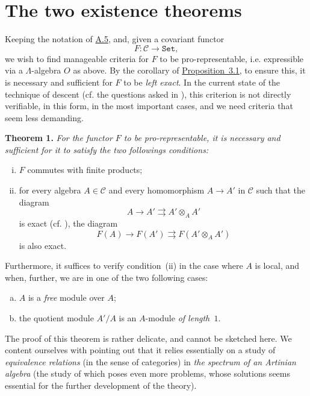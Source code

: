 \documentclass{article}
\newenvironment{itenv}[1]
  {\phantomsection\par\medskip\noindent\textbf{#1.}\itshape}
  {\par\medskip}
\renewcommand{\cal}[1]{{\mathcal{#1}}}
\newcommand{\Set}{\mathtt{Set}}
\newcommand{\oldpage}[1]{\marginpar{\footnotesize$\Big\vert$ \textit{p.~#1}}}
\begin{document}
\part{The two existence theorems}
\label{B}

Keeping the notation of \hyperref[A.5]{A.5}, and, given a covariant functor
\[
  F\colon \cal{C} \to \Set,
\]
we wish to find manageable criteria for $F$ to be pro-representable, i.e. expressible via a $\Lambda$-algebra $O$ as above.
By the corollary of \hyperref[A.3-proposition1]{Proposition~3.1}, to ensure this, it is necessary and sufficient for $F$ to be \emph{left exact}.
In the current state of the technique of descent (cf. the questions asked in \cite[p.~9]{3}), this criterion is not directly verifiable, in this form, in the most important cases, and we need criteria that seem less demanding.

\begin{itenv}{Theorem 1}
\label{B-theorem1}
  For the functor $F$ to be pro-representable, it is necessary and sufficient for it to satisfy the two followings conditions:
  \begin{enumerate}[(i)]
    \item $F$ commutes with finite products;
    \item for every algebra $A\in\cal{C}$ and every homomorphism $A\to A'$ in $\cal{C}$ such that the diagram
      \[
        A \to A' \rightrightarrows A'\otimes_A A'
      \]
      is exact (cf. \cite[A, Definition~1.2]{3}), the diagram
      \[
        F(A) \to F(A') \rightrightarrows F(A'\otimes_A A')
      \]
\oldpage{195-10}
      is also exact.
  \end{enumerate}

  Furthermore, it suffices to verify condition~(ii) in the case where $A$ is local, and when, further, we are in one of the two following cases:
  \begin{enumerate}[(a)]
    \item $A$ is a \emph{free} module over $A$;
    \item the quotient module $A'/A$ is an $A$-module \emph{of length~$1$}.
  \end{enumerate}
\end{itenv}

The proof of this theorem is rather delicate, and cannot be sketched here.
We content ourselves with pointing out that it relies essentially on a study of \emph{equivalence relations} (in the sense of categories) in \emph{the spectrum of an Artinian algebra} (the study of which poses even more problems, whose solutions seems essential for the further development of the theory).
\end{document}
